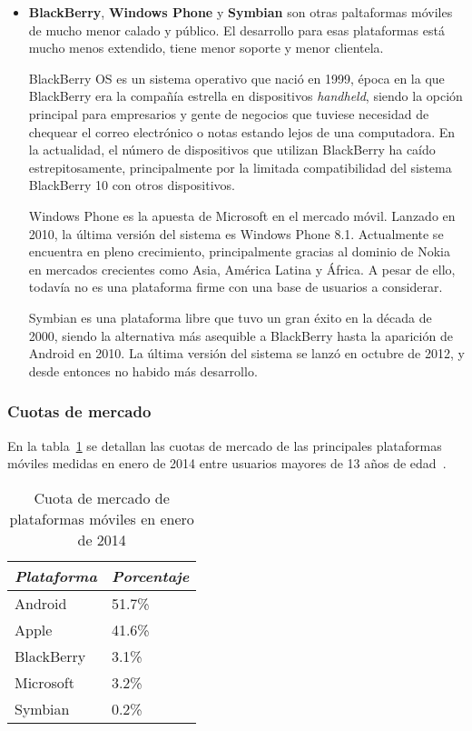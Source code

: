 \begin{itemize}
\item \textbf{BlackBerry}, \textbf{Windows Phone} y \textbf{Symbian} son otras
  paltaformas móviles de mucho menor calado y público. El desarrollo para esas
  plataformas está mucho menos extendido, tiene menor soporte y menor clientela.

  BlackBerry OS es un sistema operativo que nació en 1999, época en la que
  BlackBerry era la compañía estrella en dispositivos \textit{handheld}, siendo
  la opción principal para empresarios y gente de negocios que tuviese necesidad
  de chequear el correo electrónico o notas estando lejos de una computadora. En
  la actualidad, el número de dispositivos que utilizan BlackBerry ha caído
  estrepitosamente, principalmente por la limitada compatibilidad del sistema
  BlackBerry 10 con otros dispositivos.

  Windows Phone es la apuesta de Microsoft en el mercado móvil. Lanzado en 2010,
  la última versión del sistema es Windows Phone 8.1. Actualmente se encuentra
  en pleno crecimiento, principalmente gracias al dominio de Nokia en mercados
  crecientes como Asia, América Latina y África\cite{wp-beats-ios}. A pesar de
  ello, todavía no es una plataforma firme con una base de usuarios a considerar.

  Symbian es una plataforma libre que tuvo un gran éxito en la década de 2000,
  siendo la alternativa más asequible a BlackBerry hasta la aparición de Android
  en 2010. La última versión del sistema se lanzó en octubre de 2012, y desde
  entonces no habido más desarrollo.

\end{itemize}

\subsubsection{Cuotas de mercado}

En la tabla~\ref{tab:cuota-2014} se detallan las cuotas de mercado de las
principales plataformas móviles medidas en enero de 2014 entre usuarios mayores
de 13 años de edad~\cite{comscore-report-2014}.

\begin{table}[hbtp]
  \centering
  \begin{tabular}[h]{|l|l|}
    \hline
    \textit{Plataforma} & \textit{Porcentaje} \\
    \hline
    Android & 51.7\% \\
    Apple & 41.6\% \\
    BlackBerry & 3.1\% \\
    Microsoft & 3.2\% \\
    Symbian & 0.2\% \\
    \hline
  \end{tabular}
  \caption{Cuota de mercado de plataformas móviles en enero de 2014}
  \label{tab:cuota-2014}
\end{table}

